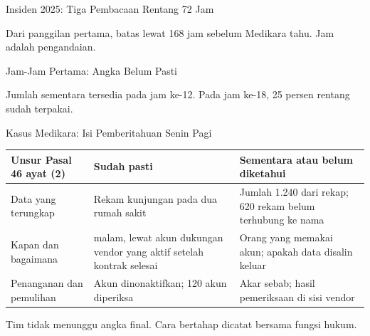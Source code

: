 \documentclass[aspectratio=169, table, 12pt]{beamer}
\begin{document}
\begin{frame}{{\Large Insiden 2025: Tiga Pembacaan Rentang 72 Jam}}
  \vspace{2pt}
  \begin{center}
    \resizebox{0.97\textwidth}{!}{}
  \end{center}
  \vspace{-4pt}
  \small Dari panggilan pertama, batas lewat 168 jam sebelum Medikara tahu. Jam adalah pengandaian.
\end{frame}

\begin{frame}{{\Large Jam-Jam Pertama: Angka Belum Pasti}}
  \vspace{6pt}
  \begin{center}
    \resizebox{0.97\textwidth}{!}{}
  \end{center}
  \small Jumlah sementara tersedia pada jam ke-12. Pada jam ke-18, 25 persen rentang sudah terpakai.
\end{frame}

\begin{frame}{{\Large Kasus Medikara: Isi Pemberitahuan Senin Pagi}}
  \vspace{4pt}
  \footnotesize
  \begin{tabularx}{\textwidth}{|>{\raggedright\arraybackslash}p{}|>{\raggedright\arraybackslash}X|>{\raggedright\arraybackslash}X|}
    \hline
    \textbf{Unsur Pasal 46 ayat (2)} & \textbf{Sudah pasti} & \textbf{Sementara atau belum
    diketahui} \\ \hline
    Data yang terungkap & Rekam kunjungan pada dua rumah sakit & Jumlah 1.240 dari rekap; 620 rekam
    belum terhubung ke nama \\ \hline
    Kapan dan bagaimana & 8 malam, lewat akun dukungan vendor yang aktif setelah kontrak selesai &
    Orang yang memakai akun; apakah data disalin keluar \\ \hline
    Penanganan dan pemulihan & Akun dinonaktifkan; 120 akun diperiksa & Akar sebab; hasil
    pemeriksaan di sisi vendor \\ \hline
  \end{tabularx}

  \vspace{8pt}
  \small Tim tidak menunggu angka final. Cara bertahap dicatat bersama fungsi hukum.
\end{frame}
\end{document}
